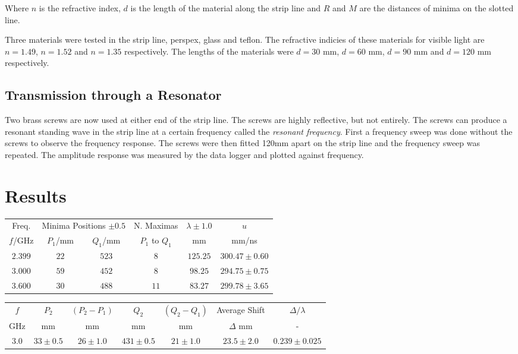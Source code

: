 \documentclass[12pt]{article}
\begin{document}
Where $n$ is the refractive index, $d$ is the length of the material along the strip line and $R$ and $M$ are the distances of minima on the slotted line.

Three materials were tested in the strip line, perspex, glass and teflon. The refractive indicies of these materials for visible light are $n = 1.49$, $n = 1.52$ and $n = 1.35$ respectively.
The lengths of the materials were $d = 30$ mm, $d = 60$ mm, $d = 90$ mm and $d = 120$ mm respectively.

\subsection{Transmission through a Resonator}

Two brass screws are now used at either end of the strip line. The screws are highly reflective, but not entirely.
The screws can produce a resonant standing wave in the strip line at a certain frequency called the \textit{resonant frequency}.
First a frequency sweep was done without the screws to observe the frequency response.
The screws were then fitted 120mm apart on the strip line and the frequency sweep was repeated.
The amplitude response was measured by the data logger and plotted against frequency.

\section{Results}

\begin{center}
    \begin{tabular}{|c|c|c|c|c|c|}
    \hline
    Freq. & \multicolumn{2}{|c|}{Minima Positions $\pm0.5$} & N. Maximas &$\lambda\pm1.0$ & $u$ \\
    $f$/GHz & $P_1$/mm & $Q_1$/mm & $P_1$ to $Q_1$ & mm & mm/ns\\
    \hline 
    $2.399$	& $22$	& $523$	& $8$	& $125.25$	& $300.47\pm0.60$ \\
    $3.000$	& $59$	& $452$	& $8$	& $98.25$	& $294.75\pm0.75$ \\
    $3.600$	& $30$	& $488$	& $11$	& $83.27$	& $299.78\pm3.65$ \\
    \hline
    \end{tabular}
    \label{tab:1}
\end{center}

\begin{center}
    \begin{tabular}{|c|c|c|c|c|c|c|}
    \hline
    $f$ & $P_2$ & $(P_2-P_1)$ & $Q_2$ & $(Q_2-Q_1)$ & Average Shift & $\Delta / \lambda$ \\
    GHz & mm & mm & mm & mm & $\Delta$ mm & - \\
    \hline 
    $3.0$ & $33\pm0.5$ & $26\pm1.0$ & $431\pm0.5$ & $21\pm1.0$ & $23.5\pm2.0$ & $0.239\pm0.025$ \\
    \hline
    \end{tabular}
    \label{tab:2}
\end{center}
\end{document}
